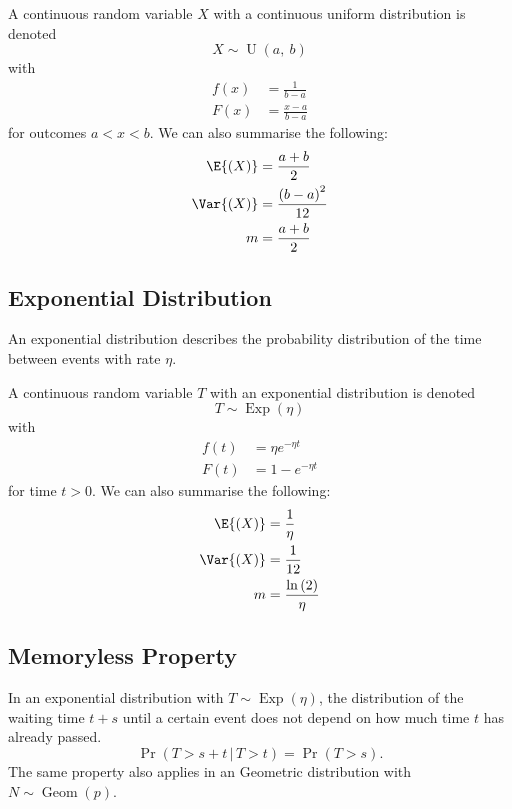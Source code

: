 \documentclass{article}
\begin{document}
\begin{multicols}{3}
    A continuous random variable \(X\) with a continuous uniform distribution is denoted
    \begin{equation*}
        X \sim \operatorname{U}{\left( a,\: b \right)}
    \end{equation*}
    with
    \begin{align*}
        f\left( x \right) & = \frac{1}{b - a}     \\
        F\left( x \right) & = \frac{x - a}{b - a}
    \end{align*}
    for outcomes \(a < x < b\).
    We can also summarise the following:
    \begin{align*}
        \E{\left( X \right)}   & = \frac{a + b}{2}                   \\
        \Var{\left( X \right)} & = \frac{\left( b - a \right)^2}{12} \\
        m                      & = \frac{a + b}{2}
    \end{align*}
    \subsection{Exponential Distribution}
    An exponential distribution describes the probability distribution of the time between events with rate \(\eta\).

    A continuous random variable \(T\) with an exponential distribution is denoted
    \begin{equation*}
        T \sim \operatorname{Exp}{\left( \eta \right)}
    \end{equation*}
    with
    \begin{align*}
        f\left( t \right) & = \eta e^{-\eta t} \\
        F\left( t \right) & = 1 - e^{-\eta t}
    \end{align*}
    for time \(t > 0\).
    We can also summarise the following:
    \begin{align*}
        \E{\left( X \right)}   & = \frac{1}{\eta}                     \\
        \Var{\left( X \right)} & = \frac{1}{12}                       \\
        m                      & = \frac{\ln{\left( 2 \right)}}{\eta}
    \end{align*}
    \subsection{Memoryless Property}
    In an exponential distribution with \(T \sim \operatorname{Exp}{\left( \eta \right)}\),
    the distribution of the waiting time \(t + s\) until a certain event does not depend on
    how much time \(t\) has already passed.
    \begin{equation*}
        \Pr{\left( T > s + t \,\vert\, T > t \right)} = \Pr{\left( T > s \right)}.
    \end{equation*}
    The same property also applies in an Geometric distribution with \(N \sim \operatorname{Geom}{\left( p \right)}\).

\end{multicols}
\end{document}

